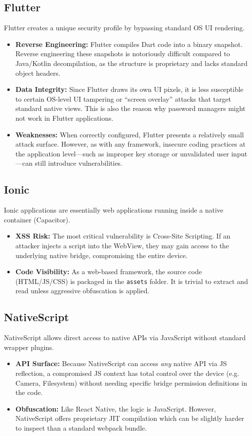 \subsection{Flutter}
Flutter creates a unique security profile by bypassing standard OS UI rendering.
\begin{itemize}
    \item \textbf{Reverse Engineering:} Flutter compiles Dart code into a binary snapshot. Reverse engineering these snapshots is notoriously difficult compared to Java/Kotlin decompilation, as the structure is proprietary and lacks standard object headers.~\cite{SEC:FT:01}
    \item \textbf{Data Integrity:} Since Flutter draws its own UI pixels, it is less susceptible to certain OS-level UI tampering or ``screen overlay'' attacks that target standard native views. This is also the reason why password managers might not work in Flutter applications.
    \item \textbf{Weaknesses:} When correctly configured, Flutter presents a relatively small attack surface. However, as with any framework, insecure coding practices at the application level—such as improper key storage or unvalidated user input—can still introduce vulnerabilities.
\end{itemize}

\subsection{Ionic}
Ionic applications are essentially web applications running inside a native container (Capacitor).
\begin{itemize}
    \item \textbf{XSS Risk:} The most critical vulnerability is Cross-Site Scripting. If an attacker injects a script into the WebView, they may gain access to the underlying native bridge, compromising the entire device. \cite{SEC:ION:01}
    \item \textbf{Code Visibility:} As a web-based framework, the source code (HTML/JS/CSS) is packaged in the \texttt{assets} folder. It is trivial to extract and read unless aggressive obfuscation is applied. \cite{SEC:ION:02}
\end{itemize}

\subsection{NativeScript}
NativeScript allows direct access to native APIs via JavaScript without standard wrapper plugins.
\begin{itemize}
    \item \textbf{API Surface:} Because NativeScript can access \textit{any} native API via JS reflection, a compromised JS context has total control over the device (e.g. Camera, Filesystem) without needing specific bridge permission definitions in the code.
    \item \textbf{Obfuscation:} Like React Native, the logic is JavaScript. However, NativeScript offers proprietary JIT compilation which can be slightly harder to inspect than a standard webpack bundle. \cite{SEC:NS:01}
\end{itemize}

